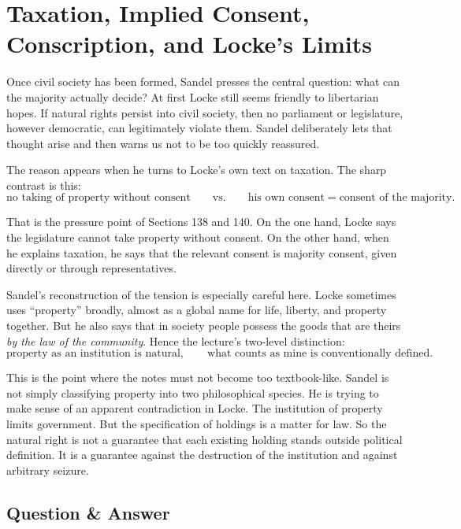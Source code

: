 \section{Taxation, Implied Consent, Conscription, and Locke's Limits}

Once civil society has been formed, Sandel presses the central question: what can the majority actually decide? At first Locke still seems friendly to libertarian hopes. If natural rights persist into civil society, then no parliament or legislature, however democratic, can legitimately violate them. Sandel deliberately lets that thought arise and then warns us not to be too quickly reassured.

The reason appears when he turns to Locke's own text on taxation. The sharp contrast is this:
\begin{equation}
\text{no taking of property without consent}
\qquad\text{vs.}\qquad
\text{his own consent}=\text{consent of the majority}.
\end{equation}

That is the pressure point of Sections 138 and 140. On the one hand, Locke says the legislature cannot take property without consent. On the other hand, when he explains taxation, he says that the relevant consent is majority consent, given directly or through representatives.

Sandel's reconstruction of the tension is especially careful here. Locke sometimes uses ``property'' broadly, almost as a global name for life, liberty, and property together. But he also says that in society people possess the goods that are theirs \emph{by the law of the community}. Hence the lecture's two-level distinction:
\begin{equation}
\text{property as an institution is natural},
\qquad
\text{what counts as mine is conventionally defined}.
\end{equation}

This is the point where the notes must not become too textbook-like. Sandel is not simply classifying property into two philosophical species. He is trying to make sense of an apparent contradiction in Locke. The institution of property limits government. But the specification of holdings is a matter for law. So the natural right is not a guarantee that each existing holding stands outside political definition. It is a guarantee against the destruction of the institution and against arbitrary seizure.

\subsection{Question \& Answer}

